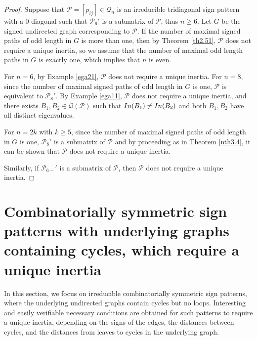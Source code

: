 \documentclass[10pt,a4paper]{amsart}
\numberwithin{equation}{section}
\def\In{{\rm In}}
\begin{document}
\begin{proof}
	Suppose that $\mathcal{P}=[p_{ij}]\in \mathcal{Q}_n$ is an irreducible tridiagonal sign pattern with a $0$-diagonal such that $\mathcal{P}_6'$ is a submatrix of $\mathcal{P}$, thus $n\geq 6$. Let $G$ be the signed undirected graph corresponding to $\mathcal{P}$. If the number of maximal signed paths of odd length in $G$ is more than one, then by Theorem \ref{th2.51}, $\mathcal{P}$ does not require a unique inertia, so we assume that the number of maximal odd length paths in $G$ is exactly one, which implies that $n$ is even.
	
	For $n=6$, by Example \ref{ega21}, $\mathcal{P}$ does not require a unique inertia. For $n=8$, since the number of maximal signed paths of odd length in $G$ is one, $\mathcal{P}$ is equivalent to $\mathcal{P}_8'$. By Example \ref{ega11}, $\mathcal{P}$ does not require a unique inertia, and there exists $B_1, B_2\in \mathcal{Q}(\mathcal{P})$ such that $\In(B_1)\neq \In(B_2)$ and both $B_1, B_2$ have all distinct eigenvalues.
	
	For $n=2k$ with $k\geq5$, since the number of maximal signed paths of odd length in $G$ is one, $\mathcal{P}_8'$ is a submatrix of $\mathcal{P}$ and by proceeding as in Theorem \ref{nth3.4}, it can be shown that $\mathcal{P}$ does not require a unique inertia.
	
	Similarly, if ${\mathcal{P}_{6-}'}$ is a submatrix of $\mathcal{P}$, then $\mathcal{P}$ does not require a unique inertia.
\end{proof} 






\section{Combinatorially symmetric sign patterns with underlying graphs containing cycles, which require a unique inertia} \label{s4}

In this section, we focus on irreducible combinatorially symmetric sign patterns, where the underlying undirected graphs contain cycles but no loops. Interesting and easily verifiable necessary conditions are obtained for such patterns to require a unique inertia, depending on the signs of the edges, the distances between cycles, and the distances from leaves to cycles in the underlying graph.
\end{document}
